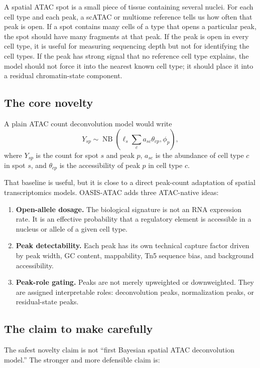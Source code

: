 \documentclass[11pt]{article}
\newcommand{\NB}{\operatorname{NB}}
\begin{document}
A spatial ATAC spot is a small piece of tissue containing several nuclei. For each cell type and each peak, a scATAC or multiome reference tells us how often that peak is open. If a spot contains many cells of a type that opens a particular peak, the spot should have many fragments at that peak. If the peak is open in every cell type, it is useful for measuring sequencing depth but not for identifying the cell types. If the peak has strong signal that no reference cell type explains, the model should not force it into the nearest known cell type; it should place it into a residual chromatin-state component.

\subsection{The core novelty}

A plain ATAC count deconvolution model would write
\[
Y_{sp} \sim \NB\left(\ell_s \sum_c a_{sc}\theta_{cp},\phi_p\right),
\]
where $Y_{sp}$ is the count for spot $s$ and peak $p$, $a_{sc}$ is the abundance of cell type $c$ in spot $s$, and $\theta_{cp}$ is the accessibility of peak $p$ in cell type $c$.

That baseline is useful, but it is close to a direct peak-count adaptation of spatial transcriptomics models. OASIS-ATAC adds three ATAC-native ideas:

\begin{enumerate}
    \item \textbf{Open-allele dosage.} The biological signature is not an RNA expression rate. It is an effective probability that a regulatory element is accessible in a nucleus or allele of a given cell type.
    \item \textbf{Peak detectability.} Each peak has its own technical capture factor driven by peak width, GC content, mappability, Tn5 sequence bias, and background accessibility.
    \item \textbf{Peak-role gating.} Peaks are not merely upweighted or downweighted. They are assigned interpretable roles: deconvolution peaks, normalization peaks, or residual-state peaks.
\end{enumerate}

\subsection{The claim to make carefully}

The safest novelty claim is not ``first Bayesian spatial ATAC deconvolution model.'' The stronger and more defensible claim is:
\end{document}
